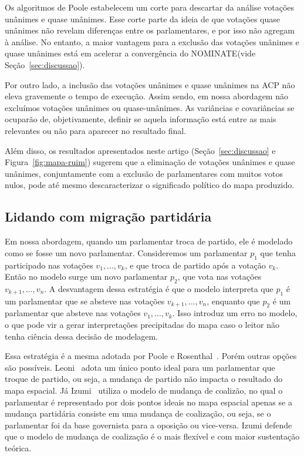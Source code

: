 \documentclass[
	article,			%
	12pt,				%
	oneside,			%
	a4paper,			%
	english,			%
	brazil,				%
	sumario=tradicional,
	oldfontcommands %
	]{abntex2}
\newcommand\nominate{NOMINATE\xspace}
\begin{document}
Os algoritmos de Poole estabelecem um corte para descartar da análise votações unânimes e quase unânimes. Esse corte parte da ideia de que votações quase unânimes não revelam diferenças entre os parlamentares, e por isso não agregam à análise. No entanto, a maior vantagem para a exclusão das votações unânimes e quase unânimes está em acelerar a convergência do \nominate (vide Seção~\ref{sec:discussao}).

Por outro lado, a inclusão das votações unânimes e quase unânimes na ACP não eleva gravemente o tempo de execução. Assim sendo, em nossa abordagem não excluímos votações unânimes ou quase-unânimes. As variâncias e covariâncias se ocuparão de, objetivamente, definir se aquela informação está entre as mais relevantes ou não para aparecer no resultado final.

Além disso, os resultados apresentados neste artigo (Seção~\ref{sec:discussao} e Figura~\ref{fig:mapa-ruim}) sugerem que a eliminação de votações unânimes e quase unânimes, conjuntamente com a exclusão de parlamentares com muitos votos nulos, pode até mesmo descaracterizar o significado político do mapa produzido.

\subsection{Lidando com migração partidária}

Em nossa abordagem, quando um parlamentar troca de partido, ele é modelado como se fosse um novo parlamentar. Consideremos um parlamentar $p_1$ que tenha participado nas votações $v_1, ..., v_k$, e que troca de partido após a votação $v_k$. Então no modelo surge um novo parlamentar $p_2$, que vota nas votações $v_{k+1}, ..., v_n$. A desvantagem dessa estratégia é que o modelo interpreta que $p_1$ é um parlamentar que se absteve nas votações $v_{k+1}, ..., v_n$, enquanto que $p_2$ é um parlamentar que absteve nas votações $v_1, ..., v_k$. Isso introduz um erro no modelo, o que pode vir a gerar interpretações precipitadas do mapa caso o leitor não tenha ciência dessa decisão de modelagem.

Essa estratégia é a mesma adotada por Poole e Rosenthal~\cite{poole2007ideology}. Porém outras opções são possíveis. Leoni~\cite{leoni02cdep} adota um único ponto ideal para um parlamentar que troque de partido, ou seja, a mudança de partido não impacta o resultado do mapa espacial. Já Izumi~\cite{izumi2016senado} utiliza o modelo de mudança de coalizão, no qual o parlamentar é representado por dois pontos ideais no mapa espacial apenas se a mudança partidária consiste em uma mudança de coalização, ou seja, se o parlamentar foi da base governista para a oposição ou vice-versa. Izumi defende que o modelo de mudança de coalização é o mais flexível e com maior sustentação teórica. 
\end{document}
